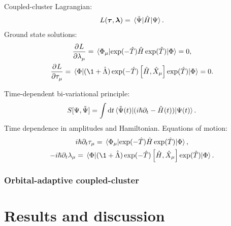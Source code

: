 \documentclass{beamer}
\begin{document}
\begin{frame}
    Coupled-cluster Lagrangian:
    \begin{align}
        L(\boldsymbol{\tau}, \boldsymbol{\lambda})
        = \mel*{\tilde{\Psi}}{\hat{H}}{\Psi}.
    \end{align}
    Ground state solutions:
    \begin{gather}
        \dpd{L}{\clustlamp_{\mu}}
        = \mel*{\slat_{\mu}}{
            \exponential(-\clust)
            \hamil
            \exponential(\clust)
        }{\slat}
        = 0, \\
        \dpd{L}{\clustamp_{\mu}}
        = \mel*{\slat}{
            (\1 + \clustl)
            \exponential(-\clust)
            \com{\hamil}{\hat{X}_{\mu}}
            \exponential(\clust)
        }{\slat}
        = 0.
    \end{gather}
\end{frame}

\begin{frame}
    Time-dependent bi-variational principle:
    \begin{align}
        S[\Psi, \tilde{\Psi}]
        =
        \int \dd t
        \mel*{\tilde{\Psi}(t)}{
            (i\hslash\partial_t - \hat{H}(t))
        }{\Psi(t)}.
    \end{align}
    Time dependence in amplitudes and Hamiltonian.
    Equations of motion:
    \begin{gather}
        i\hslash\partial_t\clustamp_{\mu}
        = \mel*{\slat_{\mu}}{
            \exponential(-\clust)
            \hamil
            \exponential(\clust)
        }{\slat},
        \\
        -i\hslash\partial_t\clustlamp_{\mu}
        = \mel*{\slat}{
            (\1 + \clustl)
            \exponential(-\clust)
            \com{\hamil}{\hat{X}_{\mu}}
            \exponential(\clust)
        }{\slat}.
    \end{gather}
\end{frame}

\begin{frame}
    \frametitle{Orbital-adaptive coupled-cluster}
\end{frame}

\section{Results and discussion}
\end{document}
